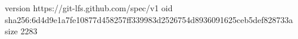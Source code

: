 version https://git-lfs.github.com/spec/v1
oid sha256:6d4d9e1a7fe10877d458257ff339983d2526754d8936091625ceb5def828733a
size 2283
